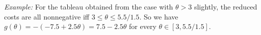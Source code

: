 \begin{enumerate}
\begin{enumerate}[label={(\arabic*)}]
\emph{Example:} For the tableau obtained from the case with \(\theta>3\)
slightly, the reduced costs are all nonnegative iff \(3\le \theta\le 5.5/1.5\).
So we have \(g(\theta)=-(-7.5+2.5\theta)=7.5-2.5\theta\) for every \(\theta\in[3,5.5/1.5]\).
\end{enumerate}
\end{enumerate}

